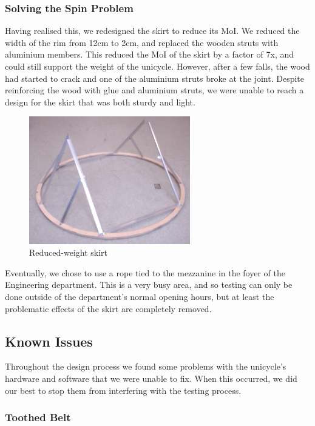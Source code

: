 \documentclass{IIBproject}
\begin{document}
\subsubsection{Solving the Spin Problem}

Having realised this, we redesigned the skirt to reduce its MoI. We reduced
the width of the rim from 12cm to 2cm, and replaced the wooden struts with
aluminium members. This reduced the MoI of the skirt by a factor of 7x, and
could still support the weight of the unicycle. However, after a few falls,
the wood had started to crack and one of the aluminium struts broke at the
joint. Despite reinforcing the wood with glue and aluminium struts, we were
unable to reach a design for the skirt that was both sturdy and light.

\begin{figure}[htpb]
  \begin{center}
    \includegraphics[width=7cm]{light_skirt.jpg}
    \end{center}
    \caption{Reduced-weight skirt}
    \label{fig:light_skirt}
    \end{figure}

Eventually, we chose to use a rope tied to the mezzanine in the foyer of the
Engineering department. This is a very busy area, and so testing can only be
done outside of the department's normal opening hours, but at least the
problematic effects of the skirt are completely removed.

\subsection{Known Issues}

Throughout the design process we found some problems with the unicycle's
hardware and software that we were unable to fix. When this occurred, we did
our best to stop them from interfering with the testing process.

\subsubsection{Toothed Belt}
\end{document}
